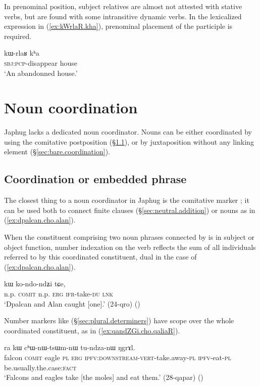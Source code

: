 In prenominal position, subject relatives are almost not attested with stative verbs, but are found with some intransitive dynamic verbs. In the lexicalized expression in (\ref{ex:kWrlaR.kha}), prenominal placement of the participle   is required.

\begin{exe}
\ex \label{ex:kWrlaR.kha}
\gll kɯ-rlaʁ kʰa \\
\textsc{sbj}:\textsc{pcp}-disappear house \\
\glt `An abandonned house.' 
\end{exe}

 \section{Noun coordination}
Japhug lacks a dedicated noun coordinator. Nouns can be either coordinated by using the comitative postposition  (§\ref{sec:coordinator.cho}), or by  juxtaposition without any linking element (§\ref{sec:bare.coordination}). 

\subsection{Coordination or embedded phrase} \label{sec:coordinator.cho}
The closest thing to a noun coordinator in Japhug is the comitative marker ; it can be used both to connect finite clauses (§\ref{sec:neutral.addition}) or nouns as in (\ref{ex:dpalcan.cho.alan}). 

When the constituent comprising two noun phrases connected by  is in subject or object function, number indexation on the verb reflects the sum of all individuals referred to by this coordinated constituent,  dual in the case of (\ref{ex:dpalcan.cho.alan}).

 \begin{exe}
\ex \label{ex:dpalcan.cho.alan}
  kɯ ko-ndo-ndʑi tɕe, \\
 n.p. \textsc{comit} n.p. \textsc{erg} \textsc{ifr}-take-\textsc{du} \textsc{lnk} \\
 \glt `Dpalcan and Alan caught [one].' (24-qro)
()
 \end{exe}
 
Number markers like  (§\ref{sec:plural.determiners}) have scope over the whole coordinated constituent, as in (\ref{ex:qandZGi.cho.qaliaR}).

\begin{exe}
\ex \label{ex:qandZGi.cho.qaliaR}
  ra kɯ cʰɯ-nɯ-tsɯm-nɯ tu-ndza-nɯ ŋgrɤl. \\
falcon \textsc{comit} eagle \textsc{pl} \textsc{erg} \textsc{ipfv}:\textsc{downstream}-\textsc{vert}-take.away-\textsc{pl} \textsc{ipfv}-eat-\textsc{pl} be.usually.the.case:\textsc{fact} \\
\glt `Falcons and eagles take [the moles] and eat them.' (28-qapar)
()
\end{exe}

